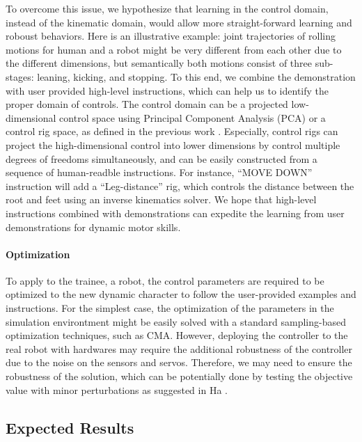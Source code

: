 To overcome this issue, we hypothesize that learning in the control domain,
instead of the kinematic domain, would allow more straight-forward 
learning and roboust behaviors.
Here is an illustrative example:
joint trajectories of rolling motions for human and a
robot might be very different from each other due to the different
dimensions, but semantically both motions consist of 
three sub-stages: leaning, kicking, and stopping.
To this end, we combine the demonstration with user provided high-level
instructions, which can help us to identify the proper domain of controls.
The control domain can be a projected low-dimensional control space using
Principal Component Analysis (PCA) or a control rig space, as defined
in the previous work \cite{Ha:2014:ITD}.
Especially, control rigs can project the high-dimensional control into
lower dimensions by control multiple degrees of freedoms simultaneously,
and can be easily constructed from a sequence of human-readble 
instructions.
For instance, ``MOVE DOWN'' instruction will add a ``Leg-distance'' rig,
which controls the distance between the root and feet using an inverse
kinematics solver.
We hope that high-level instructions combined with demonstrations
can expedite the learning from user demonstrations 
for dynamic motor skills.

\paragraph{Optimization}

To apply to the trainee, a robot, the control parameters are required to be
optimized to the new dynamic character to follow the user-provided 
examples and instructions.
For the simplest case, 
the optimization of the parameters in the simulation environtment
might be easily solved with a standard sampling-based optimization
techniques, such as CMA.
However, deploying the controller to the real robot with hardwares
may require the additional robustness of the controller
due to the noise on the sensors and servos.
Therefore, we may need to ensure the robustness of the solution,
which can be potentially done by testing the objective value 
with minor perturbations as suggested in Ha \etal \cite{Ha:2013:PSB}.

\subsection{Expected Results}

